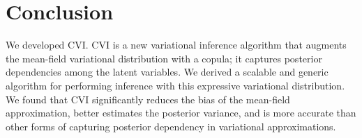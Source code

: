 \section{Conclusion}
\label{sec:conclusion}


We developed \gls{CVI}.  \gls{CVI} is a new variational
inference algorithm that augments the mean-field variational
distribution with a copula; it captures posterior dependencies among
the latent variables.  We derived a scalable and generic algorithm for
performing inference with this expressive variational distribution.
We found that \gls{CVI} significantly reduces the bias of the
mean-field approximation, better estimates the posterior variance, and
is more accurate than other forms of capturing posterior dependency in
variational approximations.

